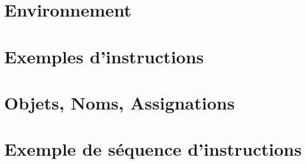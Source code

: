 

\usepackage{parcolumns}
\setlength{\parindent}{0pt}

 

%

\section{Environnement}

\section{Exemples d'instructions}


\section{Objets, Noms, Assignations}


\section{Exemple de séquence d'instructions}


